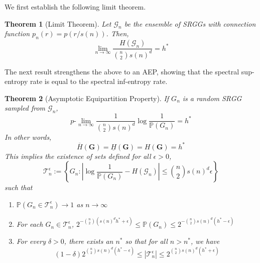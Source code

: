 \documentclass[conference,letterpaper]{IEEEtran}
\newtheorem{theorem}{Theorem}
\newcommand{\tti}{\rightarrow\infty}
\newcommand{\graph}{\mathcal{G}}
\newcommand{\prob}[1]{\mathbb{P}\left(#1\right)}
\newcommand{\plim}[0]{p\mbox{-}\lim}
\begin{document}
We first establish the following limit theorem.

\begin{theorem}[Limit Theorem]
    \label{thm:limit}
    Let $\graph_n$ be the ensemble of SRGGs with connection function $p_n(r) = p(r/s(n))$. Then,
    \begin{equation}
        \lim_{n\tti} \frac{H(\graph_n)}{\binom{n}{2}s(n)^d} = h^*
    \end{equation}
\end{theorem}

The next result strengthens the above to an AEP, showing that the spectral sup-entropy rate is equal to the spectral inf-entropy rate.

\begin{theorem}[Asymptotic Equipartition Property]
    \label{thm:aep}
    If $G_n$ is a random SRGG sampled from $\graph_n$,
    \begin{equation}
        \plim_{n\tti} \frac{1}{\binom{n}{2}s(n)^d} \log \frac{1}{\prob{G_n}} = h^*
    \end{equation} 
    In other words,
    \begin{equation}
        \overline{H}(\mathbf{G}) = \underline{H}(\mathbf{G}) = H(\mathbf{G}) = h^*
    \end{equation}
    This implies the existence of sets defined for all $\epsilon > 0$,
    \begin{equation}
        \mathcal{T}_n^\epsilon := \left\{G_n : \left|\log \frac{1}{\prob{G_n}} - H(\graph_n)\right| \leq \binom{n}{2}s(n)^d \epsilon\right\} 
    \end{equation}
    such that
    \begin{enumerate}
        \item $\prob{G_n \in \mathcal{T}_n^\epsilon} \to 1$ as $n\tti$
        \item For each $G_n \in \mathcal{T}_n^\epsilon$, $2^{-\binom{n}{2}(s(n)^dh^* +\epsilon)} \leq \prob{G_n} \leq 2^{-\binom{n}{2}s(n)^d(h^*- \epsilon)}$
        \item For every $\delta > 0$, there exists an $n^*$ so that for all $n > n^*$, we have
        \begin{equation}
            (1-\delta)2^{\binom{n}{2}s(n)^d(h^*-\epsilon)} \leq |\mathcal{T}_n^\epsilon| \leq 2^{\binom{n}{2}s(n)^d(h^*+\epsilon)}
        \end{equation}
    \end{enumerate}
\end{theorem}
\end{document}

